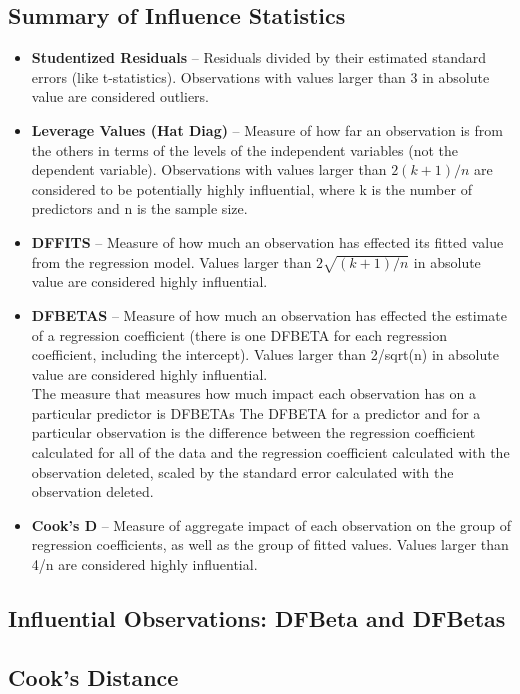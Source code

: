 \documentclass[12pt]{article}
\begin{document}
\subsection{Summary of Influence Statistics}
\begin{itemize}
\item	\textbf{Studentized Residuals} – Residuals divided by their estimated standard errors (like t-statistics). Observations with values larger than 3 in absolute value are considered outliers.
\item	\textbf{Leverage Values (Hat Diag)} – Measure of how far an observation is from the others in terms of the levels of the independent variables (not the dependent variable). Observations with values larger than $2(k+1)/n$ are considered to be potentially highly influential, where k is the number of predictors and n is the sample size.
\item	\textbf{DFFITS} – Measure of how much an observation has effected its fitted value from the regression model. Values larger than $2\sqrt{(k+1)/n}$ in absolute value are considered highly influential. %
\item	\textbf{DFBETAS} – Measure of how much an observation has effected the estimate of a regression coefficient (there is one DFBETA for each regression coefficient, including the intercept). Values larger than 2/sqrt(n) in absolute value are considered highly influential.
\\
The measure that measures how much impact each observation has on a particular predictor is DFBETAs The DFBETA for a predictor and for a particular observation is the difference between the regression coefficient calculated for all of the data and the regression coefficient calculated with the observation deleted, scaled by the standard error calculated with the observation deleted. 

\item	\textbf{Cook’s D} – Measure of aggregate impact of each observation on the group of regression coefficients, as well as the group of fitted values. Values larger than 4/n are considered highly influential.
\end{itemize}


\subsection{Influential Observations:
DFBeta and DFBetas}


\subsection{Cook's Distance}
\end{document}
